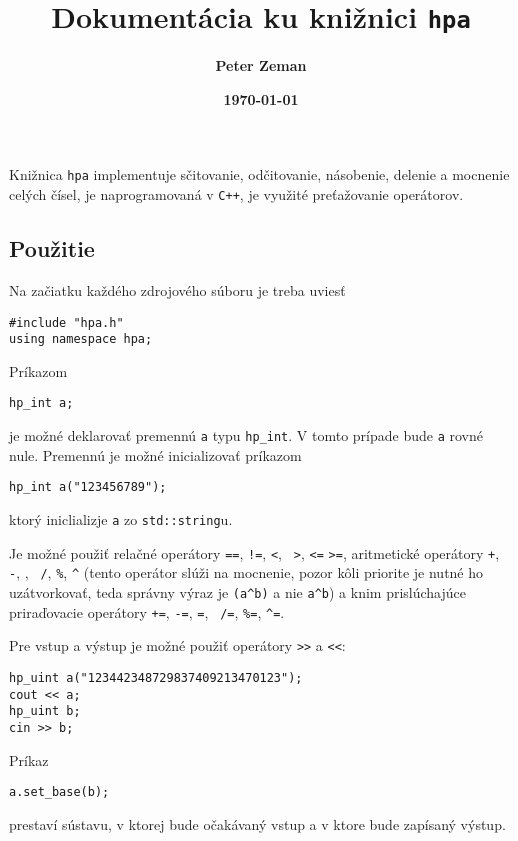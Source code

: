 \documentclass[12pt,a4paper]{article}
\title{\bf Dokumentácia ku knižnici \texttt{hpa}}
\date{\bf\today}
\author{\bf Peter Zeman}
\begin{document}
\maketitle

Knižnica {\tt hpa} implementuje sčitovanie, odčitovanie, násobenie, delenie a
mocnenie celých čísel, je naprogramovaná v {\tt C++}, je využité preťažovanie
operátorov.

\subsection*{Použitie}

Na začiatku každého zdrojového súboru je treba uviesť

\begin{verbatim}
#include "hpa.h"
using namespace hpa;
\end{verbatim}

\noindent Príkazom

\begin{verbatim}
hp_int a;
\end{verbatim}

\noindent je možné deklarovať premennú {\tt a} typu {\tt hp\_int}. V tomto
prípade bude {\tt a} rovné nule. Premennú je možné inicializovať príkazom

\begin{verbatim}
hp_int a("123456789");
\end{verbatim}

\noindent ktorý iniclializje {\tt a} zo {\tt std::string}u.

\noindent Je možné použiť relačné operátory {\tt ==}, {\tt !=}, {\tt <}, {\tt
>}, {\tt <=} {\tt >=}, aritmetické operátory {\tt +}, {\tt -}, {\tt *}, {\tt
/}, {\tt \%}, {\tt \textasciicircum} (tento operátor slúži na mocnenie, pozor kôli priorite
je nutné ho uzátvorkovať, teda správny výraz je {\tt (a\textasciicircum b)} a
nie {\tt a\textasciicircum b})
a knim prislúchajúce priraďovacie operátory {\tt +=}, {\tt -=}, {\tt *=}, {\tt
/=}, {\tt \%=}, {\tt \textasciicircum=}.

\noindent Pre vstup a výstup je možné použiť operátory {\tt >>} a {\tt <<}:

\begin{verbatim}
hp_uint a("123442348729837409213470123");
cout << a;
hp_uint b;
cin >> b;
\end{verbatim}

\noindent Príkaz

\begin{verbatim}
a.set_base(b);
\end{verbatim}

\noindent prestaví sústavu, v ktorej bude očakávaný vstup a v ktore bude
zapísaný výstup.
\end{document}
